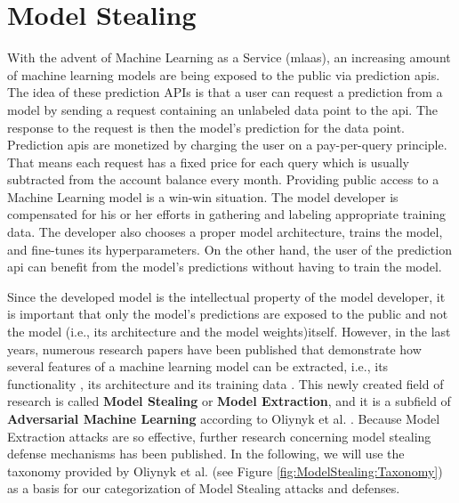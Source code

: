 \section{Model Stealing}
\label{sec:ModelStealing}
With the advent of Machine Learning as a Service (\gls{mlaas}), an increasing amount of machine learning models are being exposed to the public via 
prediction \glspl{api}. The idea of these prediction APIs is that a user can request a prediction from a model by sending a request containing an unlabeled data
point to the \gls{api}. The response to the request is then the model's prediction for the data point. Prediction \glspl{api} are monetized by charging the user
on a pay-per-query principle. That means each request has a fixed price for each query which is usually subtracted from the account balance every month. 
Providing public access to a Machine Learning model is a win-win situation. The model developer is compensated for his or her efforts in gathering and labeling
appropriate training data. The developer also chooses a proper model architecture, trains the model, and fine-tunes its hyperparameters. On the other hand,
the user of the prediction \gls{api} can benefit from the model's predictions without having to train the model. \par
Since the developed model is the intellectual property of the model developer, it is important that only the model's predictions are exposed to the public and
not the model (i.e., its architecture and the model weights)itself. However, in the last years, numerous research papers have been published that demonstrate how
several features of a machine learning model can be extracted, i.e., its functionality \cite{tramer2016stealing}, its architecture \cite{oh2019towards} and its
training data \cite{shokri2017membership}. This newly created field of research is called \textbf{Model Stealing} or \textbf{Model Extraction}, and it is a subfield
of \textbf{Adversarial Machine Learning} according to Oliynyk et al. \cite{oliynyk2022know}. Because Model Extraction attacks are so effective, further research
concerning model stealing defense mechanisms has been published. In the following, we will use the taxonomy provided by Oliynyk et al. (see Figure 
\ref{fig:ModelStealing:Taxonomy}) \cite{oliynyk2022know} as a basis for our categorization of Model Stealing attacks and defenses.

